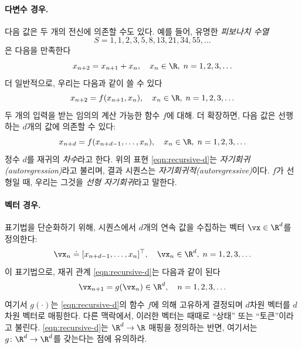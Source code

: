 \documentclass[../../book-main_ko.tex]{subfiles}
\begin{document}
\paragraph{다변수 경우.}
다음 값은 두 개의 전신에 의존할 수도 있다. 예를 들어, 유명한 \textit{피보나치 수열}
\begin{equation}
    S = 1, 1, 2, 3, 5, 8, 13, 21, 34, 55, \ldots
\end{equation}
은 다음을 만족한다
\begin{equation}
    x_{n+2} = x_{n+1} + x_{n}, \quad x_{n} \in \R, \; n = 1, 2, 3, \ldots
\end{equation}
더 일반적으로, 우리는 다음과 같이 쓸 수 있다
\begin{equation}
    x_{n+2} = f(x_{n+1}, x_{n}), \quad x_{n} \in \R, \; n = 1, 2, 3, \ldots
\end{equation}
두 개의 입력을 받는 임의의 계산 가능한 함수 \(f\)에 대해. 더 확장하면, 다음 값은 선행하는 \(d\)개의 값에 의존할 수 있다:
\begin{equation}
    x_{n+d} = f(x_{n+d-1}, \ldots, x_{n}), \quad x_{n} \in \R, \; n = 1, 2, 3, \ldots
    \label{eqn:recursive-d}
\end{equation}
정수 \(d\)를 재귀의 \textit{차수}라고 한다. 위의 표현 \eqref{eqn:recursive-d}는 \textit{자기회귀(autoregression)}라고 불리며, 결과 시퀀스는 \textit{자기회귀적(autoregressive)}이다. \(f\)가 선형일 때, 우리는 그것을 \textit{선형 자기회귀}라고 말한다.

\paragraph{벡터 경우.}
표기법을 단순화하기 위해, 시퀀스에서 \(d\)개의 연속 값을 수집하는 벡터 \(\vx \in \R^{d}\)를 정의한다:
\begin{equation}
    \vx_{n} \doteq [x_{n+d-1}, \ldots, x_{n}]^{\top}, \quad \vx_{n} \in \R^{d}, \; n = 1, 2, 3, \ldots
\end{equation}
이 표기법으로, 재귀 관계 \eqref{eqn:recursive-d}는 다음과 같이 된다
\begin{equation}
    \vx_{n+1} = g(\vx_{n}) \in \R^{d}, \quad n = 1, 2, 3, \ldots
    \label{eqn:recursive-v}
\end{equation}
여기서 \(g(\cdot)\)는 \eqref{eqn:recursive-d}의 함수 \(f\)에 의해 고유하게 결정되며 \(d\)차원 벡터를 \(d\)차원 벡터로 매핑한다. 다른 맥락에서, 이러한 벡터는 때때로 ``상태'' 또는 ``토큰''이라고 불린다. \eqref{eqn:recursive-d}는 \(\R^{d} \to \R\) 매핑을 정의하는 반면, 여기서는 \(g \colon \R^{d} \to \R^{d}\)를 갖는다는 점에 유의하라.
\end{document}
